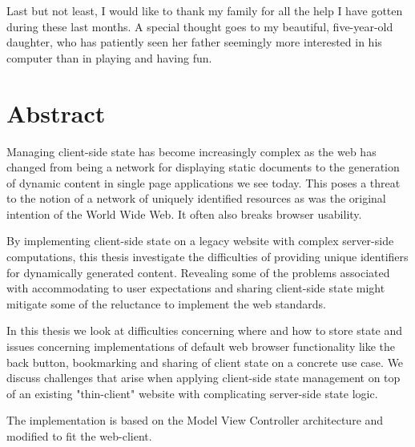 \documentclass[english]{ifimaster}
\begin{document}
Last but not least, I would like to thank my family for all the help I have gotten during these last months. A special thought goes to my beautiful, five-year-old daughter, who has patiently seen her father seemingly more interested in his computer than in playing and having fun.


\chapter*{Abstract}
Managing client-side state has become increasingly complex as the web has changed from being a network for displaying static documents to the generation of dynamic content in single page applications we see today. This poses a threat to the notion of a network of uniquely identified resources as was the original intention of the World Wide Web. It often also breaks browser usability.

By implementing client-side state on a legacy website with complex server-side computations, this thesis investigate the difficulties of providing unique identifiers for dynamically generated content. Revealing some of the problems associated with accommodating to user expectations and sharing client-side state might mitigate some of the reluctance to implement the web standards.

In this thesis we look at difficulties concerning where and how to store state and issues concerning implementations of default web browser functionality like the back button, bookmarking and sharing of client state on a concrete use case. We discuss challenges that arise when applying client-side state management on top of an existing "thin-client" website with complicating server-side state logic.

The implementation is based on the Model View Controller architecture and modified to fit the web-client. 

\end{document}
